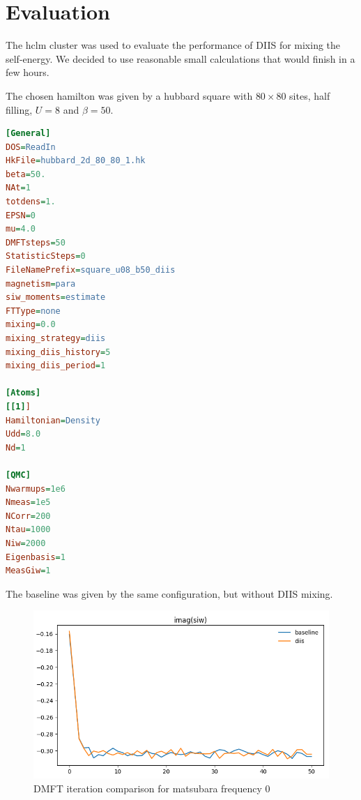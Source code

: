 \chapter{Evaluation}
\label{ch:evaluation}
The hclm cluster was used to evaluate the performance of DIIS for mixing the self-energy. We decided to use reasonable small calculations that would finish in a few hours.

The chosen hamilton was given by a hubbard square with $80\times80$ sites, half filling, $U=8$ and $\beta=50$.


\begin{lstlisting}[label=lst:w2dyn_config, language=ini, caption=The w2dynmaics configuration for this case]
[General]
DOS=ReadIn
HkFile=hubbard_2d_80_80_1.hk
beta=50.
NAt=1
totdens=1.
EPSN=0
mu=4.0
DMFTsteps=50
StatisticSteps=0
FileNamePrefix=square_u08_b50_diis
magnetism=para
siw_moments=estimate
FTType=none
mixing=0.0
mixing_strategy=diis
mixing_diis_history=5
mixing_diis_period=1

[Atoms]
[[1]]
Hamiltonian=Density
Udd=8.0
Nd=1

[QMC]
Nwarmups=1e6
Nmeas=1e5
NCorr=200
Ntau=1000
Niw=2000
Eigenbasis=1 
MeasGiw=1
\end{lstlisting}

The baseline was given by the same configuration, but without DIIS mixing.

\begin{figure}[H]
    \centering
    \includegraphics[width=1.0\textwidth]{figures/square_u08_b50_siw_imag.png}
    \caption{DMFT iteration comparison for matsubara frequency 0}
    \label{fig:dmft}
\end{figure}

